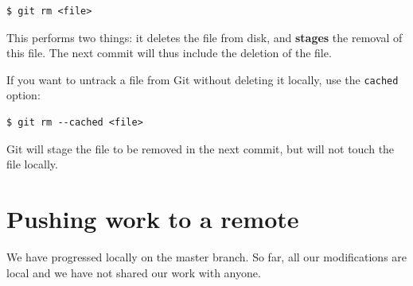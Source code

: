 \documentclass{../common/tufte-latex/tufte-handout}
\begin{document}
\begin{lstlisting}[style=BashInputStyle]
  $ git rm <file>
\end{lstlisting}

This performs two things: it deletes the file from disk, and \textbf{stages} the removal of this file.
The next commit will thus include the deletion of the file.

If you want to untrack a file from Git without deleting it locally, use the \texttt{cached} option:

\begin{lstlisting}[style=BashInputStyle]
  $ git rm --cached <file>
\end{lstlisting}

Git will stage the file to be removed in the next commit, but will not touch the file locally.

\pagebreak

\section{Pushing work to a remote}

We have progressed locally on the master branch.
So far, all our modifications are local and we have not shared our work with anyone.
\end{document}

